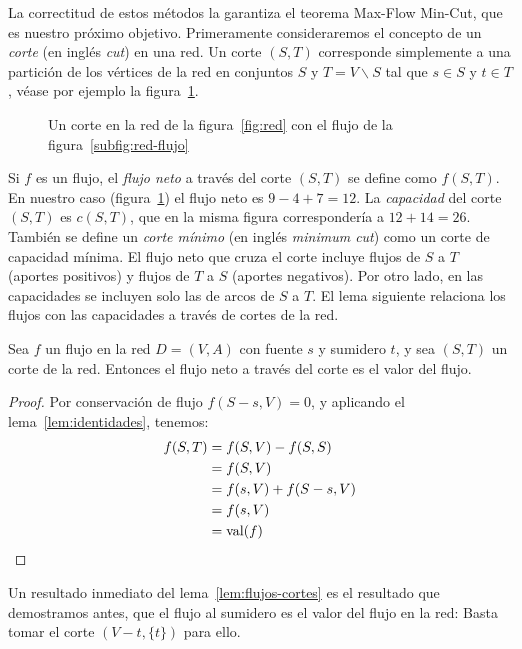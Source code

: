   La correctitud de estos métodos
  la garantiza
  el teorema \foreignlanguage{english}{Max-Flow Min-Cut},%
  que es nuestro próximo objetivo.
  Primeramente consideraremos el concepto de un \emph{corte}
  (en inglés \emph{\foreignlanguage{english}{cut}})
  en una red.
  Un corte \((S, T)\) corresponde simplemente
  a una partición de los vértices de la red
  en conjuntos \(S\) y \(T = V \smallsetminus S\)
  tal que \(s \in S\) y \(t \in T\),
  véase por ejemplo la figura~\ref{fig:red-cut}.
  \begin{figure}[htbp]
    \centering
    \caption{Un corte en la red de la figura~\ref{fig:red}
	     con el flujo de la figura~\ref{subfig:red-flujo}}
  \label{fig:red-cut}
  \end{figure}
  Si \(f\) es un flujo,
  el \emph{flujo neto} a través del corte \((S, T)\)
  se define como \(f(S, T)\).
  En nuestro caso (figura~\ref{fig:red-cut}) el flujo neto
  es \(9 - 4 + 7 = 12\).
  La \emph{capacidad} del corte \((S, T)\) es \(c(S, T)\),
  que en la misma figura correspondería a \(12 + 14 = 26\).
  También se define un \emph{corte mínimo}
  (en inglés \emph{\foreignlanguage{english}{minimum cut}})
  como un corte de capacidad mínima.
  El flujo neto que cruza el corte incluye flujos de \(S\) a \(T\)
  (aportes positivos)
  y flujos de \(T\) a \(S\)
  (aportes negativos).
  Por otro lado,
  en las capacidades se incluyen solo las de arcos de \(S\) a \(T\).
  El lema siguiente
  relaciona los flujos
  con las capacidades a través de cortes de la red.
  \begin{lemma}
    \label{lem:flujos-cortes}
    Sea \(f\) un flujo en la red \(D = (V, A)\)
    con fuente \(s\) y sumidero \(t\),
    y sea \((S, T)\) un corte de la red.
    Entonces el flujo neto a través del corte es el valor del flujo.
  \end{lemma}
  \begin{proof}
    Por conservación de flujo \(f(S - s, V) = 0\),
    y aplicando el lema~\ref{lem:identidades},
    tenemos:
    \begin{align*}
      f(S, T)
	&= f(S, V) - f(S, S) \\
	&= f(S, V) \\
	&= f(s, V) + f(S - s, V) \\
	&= f(s, V) \\
	&= \operatorname{val}(f)
      \qedhere
    \end{align*}
  \end{proof}
  Un resultado inmediato del lema~\ref{lem:flujos-cortes}
  es el resultado que demostramos antes,
  que el flujo al sumidero es el valor del flujo en la red:
  Basta tomar el corte \((V - t, \{t\})\) para ello.

